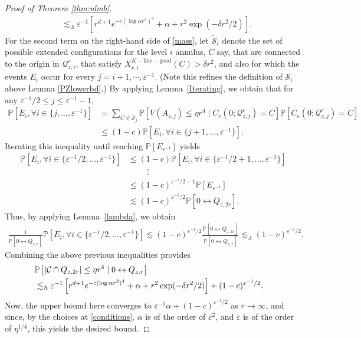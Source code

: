 \documentclass[11pt]{article}
\theoremstyle{definition}
\theoremstyle{remark}
\newcommand{\bP}{\mathbb{P}}
\numberwithin{equation}{section}
\theoremstyle{plain}
\theoremstyle{definition}
\theoremstyle{remark}
\theoremstyle{plain}
\begin{document}
\begin{proof}[Proof of Theorem \ref{thm:ulmb}]
\begin{align*}
    &\lesssim_{\Lambda} \varepsilon^{-1}\left[r^{d+1}e^{-c(\log \alpha r^2)^4}+\alpha + r^2\exp(-\delta r^2/2)\right].
\end{align*}
For the second term on the right-hand side of \eqref{mass}, let $\tilde{\mathcal S}_i$ denote the set of possible extended configurations for the level $i$ annulus, $C$ say, that are connected to the origin in $\mathcal Q_{z,i}^c$, that satisfy  $X_{r,i}^{K-\mathrm{line-good}}(C)> \delta r^2$, and also for which the events $E_i$ occur for every $j=i+1,\cdots,\varepsilon^{-1}$. (Note this refines the definition of $\mathcal{S}_i$ above Lemma \ref{PZlowerbd}.) By applying Lemma~\ref{Iterating}, we obtain that for any $\varepsilon^{-1}/2\le j\le \varepsilon^{-1}-1$,
\begin{align*}
\bP\left[E_i,\forall i\in \{j,\dots,\varepsilon^{-1}\}\right]&=\sum_{C \in \tilde{\mathcal S}_j}\bP\left[V(A_{z,j})\le \eta r^4\mid C_e(0; \mathcal Q_{z, j}^c)=C\right]\bP\left[C_e(0; \mathcal Q_{z, j}^c)=C\right]\\
&\le (1-c)\bP\left[E_i,\forall i\in \{j+1,\dots,\varepsilon^{-1}\}\right].
\end{align*}
Iterating this inequality until reaching $\bP[E_{\varepsilon^{-1}}]$ yields
\begin{align*}
\bP\left[E_i,\forall i\in \{\varepsilon^{-1}/2,\dots,\varepsilon^{-1}\}\right]
&\le (1-c)\bP\left[E_i,\forall i\in \{\varepsilon^{-1}/2+1,\dots,\varepsilon^{-1}\}\right]\\
&\hspace{28pt}\vdots\\
& \le (1-c)^{\varepsilon^{-1}/2-1}\bP[E_{\varepsilon^{-1}}]\\
&\lesssim (1-c)^{\varepsilon^{-1}/2}\bP[0 \leftrightarrow Q_{z,2r}].
\end{align*}
Thus, by applying Lemma~\ref{lambda}, we obtain
\begin{align*}
    \frac{1}{\bP[0 \leftrightarrow Q_{z,r}]}\bP\left[E_i,\forall i\in \{\varepsilon^{-1}/2,\dots,\varepsilon^{-1}\}\right]\lesssim  (1-c)^{\varepsilon^{-1}/2}\frac{\bP[0 \leftrightarrow Q_{z,2r}]}{\bP[0 \leftrightarrow Q_{z,r}]}\lesssim_{\Lambda} (1-c)^{\varepsilon^{-1}/2}.
\end{align*}
Combining the above previous inequalities provides
\begin{align*}
\lefteqn{\bP\left[|\mathcal C\cap Q_{z,2r}|\le \eta r^4\mid0 \leftrightarrow Q_{z,r}\right]}\\&\lesssim_{\Lambda} \varepsilon^{-1}\left[r^{d+1}e^{-c(\log \alpha r^2)^4}+\alpha+ r^2\exp(-\delta r^2/2)\right]+(1-c)^{\varepsilon^{-1}/2}.
\end{align*}
Now, the upper bound here converges to $\varepsilon^{-1}\alpha+(1-c)^{\varepsilon^{-1}/2}$ as $r\rightarrow\infty$, and since, by the choices at \eqref{conditions}, $\alpha$ is of the order of $\varepsilon^2$, and $\varepsilon$ is of the order of $\eta^{1/4}$, this yields the desired bound.
\end{proof}
\end{document}

